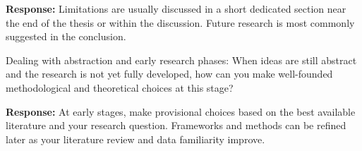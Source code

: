 \documentclass[11pt,a4paper]{article}
\begin{document}
\noindent\textbf{Response:} Limitations are usually discussed in a short dedicated section near the end of the thesis or within the discussion. Future research is most commonly suggested in the conclusion.

\vspace{1.2em}


\begin{questionbox}
Dealing with abstraction and early research phases: When ideas are still abstract and the research is not yet fully developed, how can you make well-founded methodological and theoretical choices at this stage?
\end{questionbox}

\noindent\textbf{Response:} At early stages, make provisional choices based on the best available literature and your research question. Frameworks and methods can be refined later as your literature review and data familiarity improve.
\end{document}
